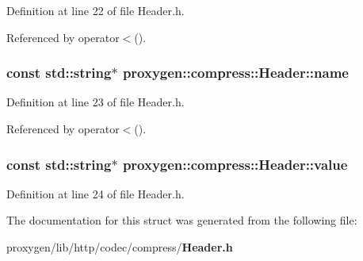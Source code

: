 Definition at line 22 of file Header.\+h.



Referenced by operator$<$().

\subsubsection[{name}]{\setlength{\rightskip}{0pt plus 5cm}const std\+::string$\ast$ proxygen\+::compress\+::\+Header\+::name}\label{structproxygen_1_1compress_1_1Header_aaf77ce8261352652b1b42d52db116766}


Definition at line 23 of file Header.\+h.



Referenced by operator$<$().

\subsubsection[{value}]{\setlength{\rightskip}{0pt plus 5cm}const std\+::string$\ast$ proxygen\+::compress\+::\+Header\+::value}\label{structproxygen_1_1compress_1_1Header_a9b73ad245fff5a716cc55d137531aee5}


Definition at line 24 of file Header.\+h.



The documentation for this struct was generated from the following file\+:\begin{DoxyCompactItemize}
\item 
proxygen/lib/http/codec/compress/{\bf Header.\+h}\end{DoxyCompactItemize}
